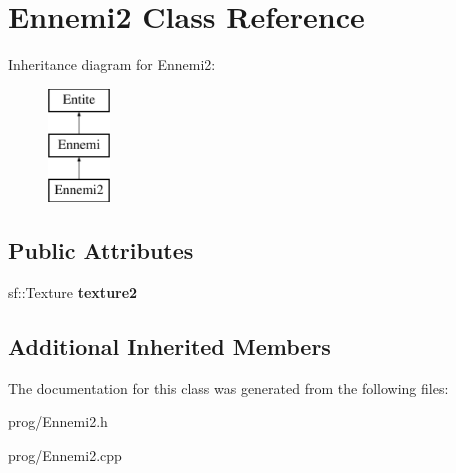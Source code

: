 \hypertarget{class_ennemi2}{}\section{Ennemi2 Class Reference}
\label{class_ennemi2}
Inheritance diagram for Ennemi2\+:\begin{figure}[H]
\begin{center}
\leavevmode
\includegraphics[height=3.000000cm]{class_ennemi2}
\end{center}
\end{figure}
\subsection*{Public Attributes}
\begin{DoxyCompactItemize}
\item 
\mbox{\label{class_ennemi2_ac1586963ba5375fbba7f9483d0393b35}} 
sf\+::\+Texture {\bfseries texture2}
\end{DoxyCompactItemize}
\subsection*{Additional Inherited Members}


The documentation for this class was generated from the following files\+:\begin{DoxyCompactItemize}
\item 
prog/Ennemi2.\+h\item 
prog/Ennemi2.\+cpp\end{DoxyCompactItemize}
